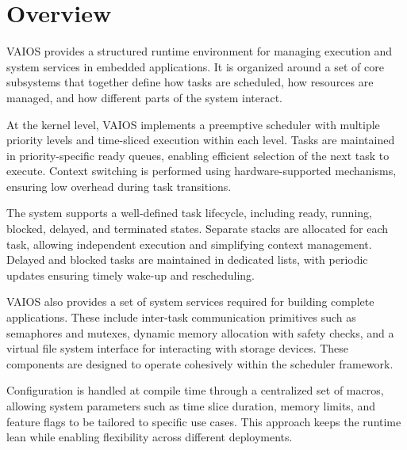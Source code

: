 \section{Overview}
\label{sec:vaios_overview}

VAIOS provides a structured runtime environment for managing execution and system services in embedded applications. It is organized around a set of core subsystems that together define how tasks are scheduled, how resources are managed, and how different parts of the system interact.

At the kernel level, VAIOS implements a preemptive scheduler with multiple priority levels and time-sliced execution within each level. Tasks are maintained in priority-specific ready queues, enabling efficient selection of the next task to execute. Context switching is performed using hardware-supported mechanisms, ensuring low overhead during task transitions.

The system supports a well-defined task lifecycle, including ready, running, blocked, delayed, and terminated states. Separate stacks are allocated for each task, allowing independent execution and simplifying context management. Delayed and blocked tasks are maintained in dedicated lists, with periodic updates ensuring timely wake-up and rescheduling.

VAIOS also provides a set of system services required for building complete applications. These include inter-task communication primitives such as semaphores and mutexes, dynamic memory allocation with safety checks, and a virtual file system interface for interacting with storage devices. These components are designed to operate cohesively within the scheduler framework.

Configuration is handled at compile time through a centralized set of macros, allowing system parameters such as time slice duration, memory limits, and feature flags to be tailored to specific use cases. This approach keeps the runtime lean while enabling flexibility across different deployments.